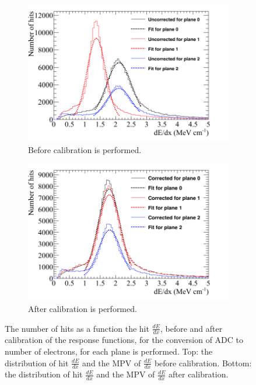 \begin{figure}
  \centering
  \begin{subfigure}{0.6\textwidth}
    \centering
    \includegraphics[width=\textwidth]{UnCorrectedCanvas}
    \caption{Before calibration is performed.}
    \label{fig:CaloTune_Before}
  \end{subfigure}
  \begin{subfigure}{0.6\textwidth}
    \centering
    \includegraphics[width=\textwidth]{CorrectedCanvas}
    \caption{After calibration is performed.}
    \label{fig:CaloTune_After}
  \end{subfigure}
  \caption[The calibration of the calorimetric constants in the 35 ton]
          {The number of hits as a function the hit $\frac{dE}{dx}$, before and after calibration of the response functions, for the conversion of ADC to number of electrons, for each plane is performed. Top: the distribution of hit $\frac{dE}{dx}$ and the MPV of $\frac{dE}{dx}$ before calibration. Bottom: the distribution of hit $\frac{dE}{dx}$ and the MPV of $\frac{dE}{dx}$ after calibration.}
          \label{fig:CaloTune}
\end{figure}
        
